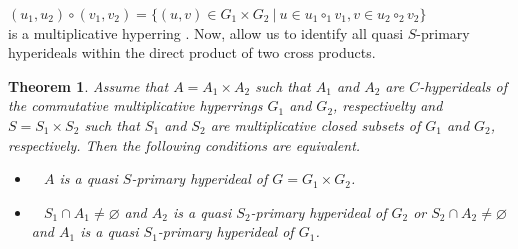 \documentclass[preprint,review,10pt]{amsart}
\newtheorem{theorem}{Theorem}[section]
\theoremstyle{definition}
\theoremstyle{remark}
\numberwithin{equation}{section}
\begin{document}
$(u_1,u_2) \circ (v_1,v_2)=\{(u,v) \in G_1 \times G_2 \ \vert \ u \in u_1 \circ_1 v_1, v \in u_2 \circ_2 v_2\}$ \\
is a multiplicative hyperring \cite{ul}.  Now, allow us to identify all  quasi $S$-primary hyperideals within the direct product of two cross products.
\begin{theorem} \label{cart}
Assume that $A=A_1 \times A_2$ such that    $A_1$ and $A_2$ are $C$-hyperideals of the commutative multiplicative hyperrings $G_1$ and $G_2$, respectivelty and $S=S_1 \times S_2$ such that  $S_1$ and $S_2$ are multiplicative closed subsets of $G_1$ and $G_2$, respectively. Then the following conditions are equivalent.
\begin{itemize}
\item[\rm{(i)}]~  $A$ is a quasi $S$-primary hyperideal of $G=G_1 \times G_2$.
\item[\rm{(ii)}]~ $S_1 \cap A_1 \neq \varnothing$ and $A_2$ is a quasi $S_2$-primary hyperideal of $G_2$ or $S_2 \cap A_2 \neq \varnothing$ and $A_1$ is a quasi $S_1$-primary hyperideal of $G_1$.
\end{itemize}
\end{theorem}
\end{document}
